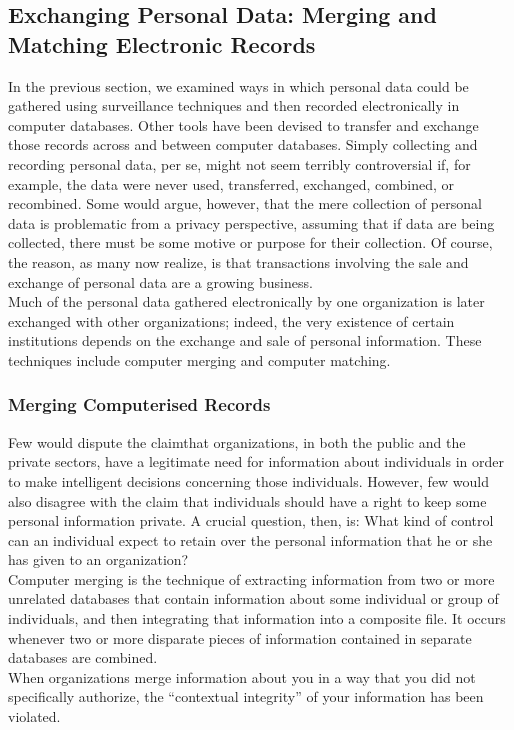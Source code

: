 \documentclass[12pt]{article}
\theoremstyle{definition}
\begin{document}
\subsection{Exchanging Personal Data: Merging and Matching Electronic Records}
In the previous section, we examined ways in which personal data could be gathered
using surveillance techniques and then recorded electronically in computer databases.
Other tools have been devised to transfer and exchange those records across and
between computer databases. Simply collecting and recording personal data, per se,
might not seem terribly controversial if, for example, the data were never used, transferred,
exchanged, combined, or recombined. Some would argue, however, that the mere
collection of personal data is problematic from a privacy perspective, assuming that
if data are being collected, there must be some motive or purpose for their collection.
Of course, the reason, as many now realize, is that transactions involving the sale and
exchange of personal data are a growing business.\\
Much of the personal data gathered electronically by one organization is later
exchanged with other organizations; indeed, the very existence of certain institutions
depends on the exchange and sale of personal information. These techniques include computer merging and computer matching.\\
\subsubsection{Merging Computerised Records}
Few would dispute the claimthat organizations, in both the public and the private sectors,
have a legitimate need for information about individuals in order to make intelligent
decisions concerning those individuals. However, few would also disagree with the claim that individuals should have a right to keep some personal information private. A crucial question, then, is: What kind of
control can an individual expect to retain over the personal information that he or she has
given to an organization?\\
Computer merging is the technique of extracting information from two or more
unrelated databases that contain information about some individual or group of individuals,
and then integrating that information into a composite file. It occurs whenever
two or more disparate pieces of information contained in separate databases are
combined.\\
When organizations merge information about you in a way that you did not specifically authorize, the “contextual integrity” of your information has been violated.
\end{document}
